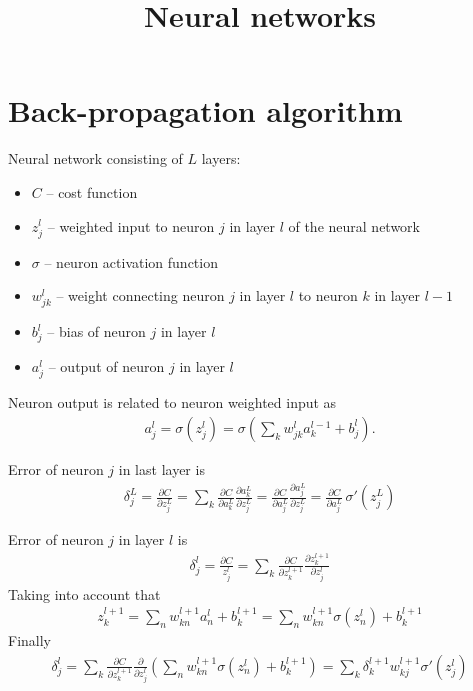 \documentclass[10pt]{article}
\title{Neural networks}
\begin{document}
\maketitle

\section{Back-propagation algorithm}
Neural network consisting of $L$ layers:
\begin{itemize}
	\item $C$ -- cost function
	\item $z_{j}^l$ -- weighted input to neuron $j$ in layer $l$ of the neural network
	\item $\sigma$ -- neuron activation function
	\item $w^{l}_{jk}$ -- weight connecting neuron $j$ in layer $l$ to neuron $k$ in layer $l-1$
	\item $b^{l}_j$ -- bias of neuron $j$ in layer $l$
	\item $a^{l}_j$ -- output of neuron $j$ in layer $l$
\end{itemize}

Neuron output is related to neuron weighted input as
\begin{align}
a^l_j = \sigma\left(z^l_j\right)=\sigma\left(\sum_k w^l_{jk} a^{l-1}_k + b^l_j\right).
\end{align}

Error of neuron $j$ in last layer is
\begin{align}
\delta_j^L = \frac{\partial C}{\partial z_j^L} = \sum_k \frac{\partial C}{\partial a_k^L} \frac{\partial a_k^L}{\partial z_j^L} = \frac{\partial C}{\partial a_j^L} \frac{\partial a_j^L}{\partial z_j^L} = \frac{\partial C}{\partial a_j^L} \, \sigma'\left(z_j^L\right)
\end{align}

Error of neuron $j$ in layer $l$ is 
\begin{align*}
\delta_j^l = \frac{\partial C}{z_j^l} = \sum_k \frac{\partial C}{\partial z_k^{l+1}} \frac{\partial z_k^{l+1}}{\partial z_j^l}
\end{align*}
Taking into account that
\begin{align*}
z_k^{l+1} = \sum_n w^{l+1}_{k n} a^l_n + b^{l+1}_k = \sum_n w^{l+1}_{k n} \sigma(z_n^l) + b^{l+1}_k
\end{align*}
Finally
\begin{align}
\delta_j^l = \sum_k \frac{\partial C}{\partial z_k^{l+1}} \frac{\partial}{\partial z_j^l} \left(\sum_n w^{l+1}_{k n} \sigma(z_n^l) + b^{l+1}_k\right) = \sum_k \delta^{l+1}_k w^{l+1}_{k j}  \sigma'(z_j^l)
\end{align}
\end{document}
